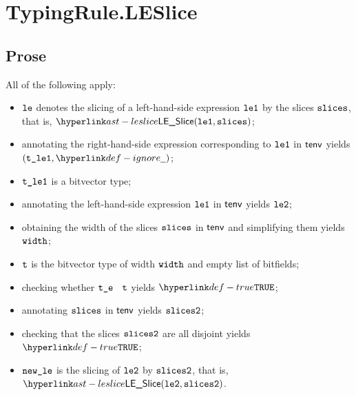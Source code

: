 
\section{TypingRule.LESlice \label{sec:TypingRule.LESlice}}

\subsection{Prose}
All of the following apply:
\begin{itemize}
  \item $\texttt{le}$ denotes the slicing of a left-hand-side expression $\texttt{le1}$ by the slices $\texttt{slices}$, that is, $\LESlice(\vleone, \slices)$;
  \item annotating the right-hand-side expression corresponding to $\texttt{le1}$ in $\textsf{tenv}$ yields \\
        $(\vtleone, \Ignore)$\ProseOrTypeError;
  \item $\texttt{t\_le1}$ is a bitvector type;
  \item annotating the left-hand-side expression $\texttt{le1}$ in $\textsf{tenv}$ yields $\texttt{le2}$\ProseOrTypeError;
  \item obtaining the width of the slices $\texttt{slices}$ in $\textsf{tenv}$ and simplifying them yields $\texttt{width}$;
  \item $\texttt{t}$ is the bitvector type of width $\texttt{width}$ and empty list of bitfields;
  \item checking whether $\texttt{t\_e}$ \typesatisfies\ $\texttt{t}$ yields $\True$\ProseOrTypeError;
  \item annotating $\texttt{slices}$ in $\textsf{tenv}$ yields $\texttt{slices2}$\ProseOrTypeError;
  \item checking that the slices $\texttt{slices2}$ are all disjoint yields $\True$\ProseOrTypeError;
  \item $\texttt{new\_le}$ is the slicing of $\texttt{le2}$ by $\texttt{slices2}$, that is, $\LESlice(\vletwo, \slicestwo)$.
\end{itemize}




